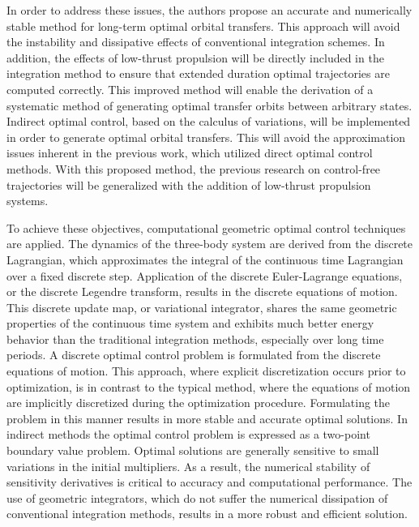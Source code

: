 \documentclass[letterpaper, paper,11pt]{AAS}		%
\begin{document}
In order to address these issues, the authors propose an accurate and numerically stable method for long-term optimal orbital transfers.
This approach will avoid the instability and dissipative effects of conventional integration schemes.
In addition, the effects of low-thrust propulsion will be directly included in the integration method to ensure that extended duration optimal trajectories are computed correctly.
This improved method will enable the derivation of a systematic method of generating optimal transfer orbits between arbitrary states.
Indirect optimal control, based on the calculus of variations, will be implemented in order to generate optimal orbital transfers.
This will avoid the approximation issues inherent in the previous work, which utilized direct optimal control methods.
With this proposed method, the previous research on control-free trajectories will be generalized with the addition of low-thrust propulsion systems.

To achieve these objectives, computational geometric optimal control techniques are applied. 
The dynamics of the three-body system are derived from the discrete Lagrangian, which approximates the integral of the continuous time Lagrangian over a fixed discrete step.
Application of the discrete Euler-Lagrange equations, or the discrete Legendre transform, results in the discrete equations of motion.
This discrete update map, or variational integrator, shares the same geometric properties of the continuous time system and exhibits much better energy behavior than the traditional integration methods, especially over long time periods.
A discrete optimal control problem is formulated from the discrete equations of motion.
This approach, where explicit discretization occurs prior to optimization,  is in contrast to the typical method, where the equations of motion are implicitly discretized during the optimization procedure.
Formulating the problem in this manner results in more stable and accurate optimal solutions. 
In indirect methods the optimal control problem is expressed as a two-point boundary value problem.
Optimal solutions are generally sensitive to small variations in the initial multipliers.
As a result, the numerical stability of sensitivity derivatives is critical to accuracy and computational performance. 
The use of geometric integrators, which do not suffer the numerical dissipation of conventional integration methods, results in a more robust and efficient solution.
\end{document}
